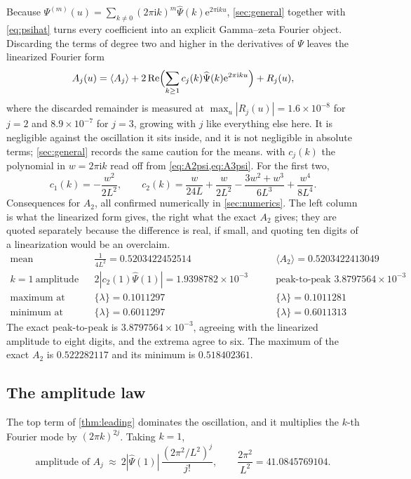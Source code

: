 \documentclass[11pt,oneside]{article}
\theoremstyle{definition}
\theoremstyle{remark}
\newcommand{\e}{\mathrm e}
\newcommand{\ii}{\mathrm i}
\newcommand{\Psihat}{\widehat\Psi}
\begin{document}
Because $\Psi^{(m)}(u)=\sum_{k\ne0}(2\pi\ii k)^m\Psihat(k)\e^{2\pi\ii ku}$,
\cref{sec:general} together with \cref{eq:psihat} turns every coefficient into
an explicit Gamma--zeta Fourier object.  Discarding the terms of degree two
and higher in the derivatives of $\Psi$ leaves the linearized Fourier form
\[
  A_j(u)=\langle A_j\rangle
   +2\operatorname{Re}\Bigl(\sum_{k\ge1}c_j(k)\Psihat(k)\e^{2\pi\ii ku}\Bigr)
   +R_j(u),
\]
where the discarded remainder is measured at
$\max_u|R_j(u)|=1.6\times10^{-8}$ for $j=2$ and $8.9\times10^{-7}$ for
$j=3$, growing with $j$ like everything else here.  It is negligible against
the oscillation it sits inside, and it is not negligible in absolute terms;
\cref{sec:general} records the same caution for the means.
with $c_j(k)$ the polynomial in $w=2\pi\ii k$ read off from
\cref{eq:A2psi,eq:A3psi}.  For the first two,
\[
  c_1(k)=-\frac{w^2}{2L^2},
  \qquad
  c_2(k)=\frac{w}{24L}+\frac{w}{2L^2}-\frac{3w^2+w^3}{6L^3}+\frac{w^4}{8L^4}.
\]
Consequences for $A_2$, all confirmed numerically in \cref{sec:numerics}.
The left column is what the linearized form gives, the right what the exact
$A_2$ gives; they are quoted separately because the difference is real, if
small, and quoting ten digits of a linearization would be an overclaim.
\[
\begin{aligned}
  \text{mean}&&\tfrac1{4L^2}=0.5203422452514&\qquad
    \langle A_2\rangle=0.5203422413049\\
  k=1\ \text{amplitude}&&2|c_2(1)\Psihat(1)|=1.9398782\times10^{-3}&\qquad
    \text{peak-to-peak }3.8797564\times10^{-3}\\
  \text{maximum at}&&\{\lambda\}=0.1011297&\qquad\{\lambda\}=0.1011281\\
  \text{minimum at}&&\{\lambda\}=0.6011297&\qquad\{\lambda\}=0.6011313
\end{aligned}
\]
The exact peak-to-peak is $3.8797564\times10^{-3}$, agreeing with the
linearized amplitude to eight digits, and the extrema agree to six.  The
maximum of the exact $A_2$ is $0.522282117$ and its minimum is
$0.518402361$.

\subsection{The amplitude law}

The top term of \cref{thm:leading} dominates the oscillation, and it multiplies
the $k$-th Fourier mode by $(2\pi k)^{2j}$.  Taking $k=1$,
\begin{equation}\label{eq:amplitude}
  \text{amplitude of }A_j\ \approx\
  2|\Psihat(1)|\,\frac{(2\pi^2/L^2)^j}{j!},
  \qquad \frac{2\pi^2}{L^2}=41.0845769104 .
\end{equation}
\end{document}

